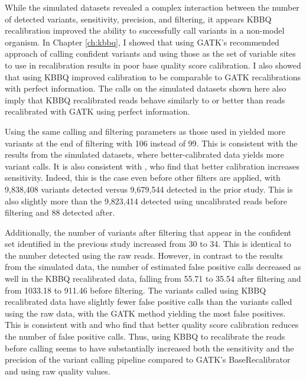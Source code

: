 While the simulated datasets revealed a complex interaction between the number of detected variants, sensitivity, precision, and filtering, it appears KBBQ recalibration improved the ability to successfully call variants in a non-model organism. In Chapter \ref{ch:kbbq}, I showed that using GATK's recommended approach of calling confident variants and using those as the set of variable sites to use in recalibration results in poor base quality score calibration. I also showed that using KBBQ improved calibration to be comparable to GATK recalibrations with perfect information. The calls on the simulated datasets shown here also imply that KBBQ recalibrated reads behave similarly to or better than reads recalibrated with GATK using perfect information.

Using the same calling and filtering parameters as those used in \cite{orr_phylogenomic_2020} yielded more variants at the end of filtering with 106 instead of 99. This is consistent with the results from the simulated datasets, where better-calibrated data yields more variant calls. It is also consistent with \cite{ni_improvement_2016}, who find that better calibration increases sensitivity. Indeed, this is the case even before other filters are applied, with 9,838,408 variants detected versus 9,679,544 detected in the prior study. This is also slightly more than the 9,823,414 detected using uncalibrated reads before filtering and 88 detected after.

Additionally, the number of variants after filtering that appear in the confident set identified in the previous study increased from 30 to 34. This is identical to the number detected using the raw reads. However, in contrast to the results from the simulated data, the number of estimated false positive calls decreased as well in the KBBQ recalibrated data, falling from 55.71 to 35.54 after filtering and from 1033.18 to 911.46 before filtering. The variants called using KBBQ recalibrated data have slightly fewer false positive calls than the variants called using the raw data, with the GATK method yielding the most false positives. This is consistent with \cite{ni_improvement_2016} and \cite{li_improving_2011} who find that better quality score calibration reduces the number of false positive calls. Thus, using KBBQ to recalibrate the reads before calling seems to have substantially increased both the sensitivity and the precision of the variant calling pipeline compared to GATK's BaseRecalibrator and using raw quality values.

